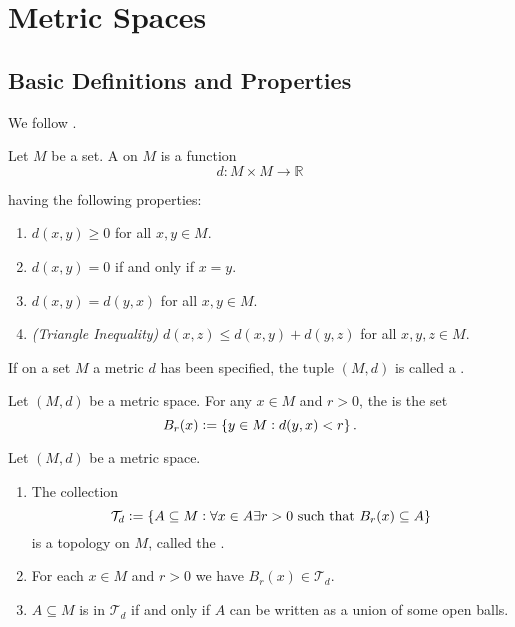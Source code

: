 \section{Metric Spaces}
\subsection{Basic Definitions and Properties}
We follow \cite[396 -- 398]{lee:topological_manifolds:2011}.

\begin{definition}
	Let $M$ be a set. A  on $M$ is a function 	
	\begin{equation}
		d: M \times M \to \mathbb {R}
	\end{equation}

	\noindent having the following properties:

	\begin{enumerate}
		\item $d(x,y) \geq 0$ for all $x,y \in M$.
		\item $d(x,y) = 0$ if and only if $x = y$.
		\item $d(x,y) = d(y,x)$ for all $x,y \in M$.
		\item \emph{(Triangle Inequality)} $d(x,z) \leq d(x,y) + d(y,z)$ for all $x,y,z \in M$.

	\end{enumerate}
	
	If on a set $M$ a metric $d$ has been specified, the tuple $(M,d)$ is called a .
\end{definition}

\begin{definition}
	Let $(M,d)$ be a metric space. For any $x \in M$ and $r > 0$, the  is the set 
	\begin{equation}
		B_r(x) := \cbr[0]{y \in M : d(y,x) < r}.
	\end{equation}
\end{definition}

\begin{proposition}
	Let $(M,d)$ be a metric space. 
	
	\begin{enumerate}[label = \textup{(}\alph*\textup{)}]
		\item The collection
			\begin{equation}
				\mathcal{T}_d := \cbr[0]{A \subseteq M :  \forall x \in A \exists r > 0 \text{ such that } B_r(x) \subseteq A}
			\end{equation}
			\noindent is a topology on $M$, called the .
		
		\item For each $x \in M$ and $r > 0$ we have $B_r(x) \in \mathcal{T}_d$.
		\item $A \subseteq M$ is in $\mathcal{T}_d$ if and only if $A$ can be written as a union of some open balls.
	\end{enumerate}
\end{proposition}


